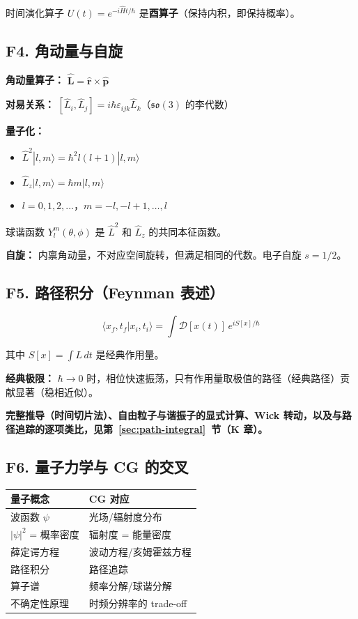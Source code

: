 时间演化算子 $U(t) = e^{-i\hat{H}t/\hbar}$ 是\textbf{酉算子}（保持内积，即保持概率）。

\subsection{F4. 角动量与自旋}

\textbf{角动量算子：} $\hat{\mathbf{L}} = \hat{\mathbf{r}} \times \hat{\mathbf{p}}$

\textbf{对易关系：} $[\hat{L}_i, \hat{L}_j] = i\hbar\varepsilon_{ijk}\hat{L}_k$（$\mathfrak{so}(3)$ 的李代数）

\textbf{量子化：}
\begin{itemize}
  \item $\hat{L}^2|l,m\rangle = \hbar^2 l(l+1)|l,m\rangle$
  \item $\hat{L}_z|l,m\rangle = \hbar m|l,m\rangle$
  \item $l = 0, 1, 2, \ldots$，$m = -l, -l+1, \ldots, l$
\end{itemize}

球谐函数 $Y_l^m(\theta, \phi)$ 是 $\hat{L}^2$ 和 $\hat{L}_z$ 的共同本征函数。

\textbf{自旋：} 内禀角动量，不对应空间旋转，但满足相同的代数。电子自旋 $s = 1/2$。

\subsection{F5. 路径积分（Feynman 表述）}
\label{subsec:pi-brief}

\[
\langle x_f, t_f | x_i, t_i \rangle = \int \mathcal{D}[x(t)]\, e^{iS[x]/\hbar}
\]

其中 $S[x] = \displaystyle\int L\,dt$ 是经典作用量。

\textbf{经典极限：} $\hbar \to 0$ 时，相位快速振荡，只有作用量取极值的路径（经典路径）贡献显著（稳相近似）。

\textbf{完整推导（时间切片法）、自由粒子与谐振子的显式计算、Wick 转动，以及与路径追踪的逐项类比，见第~\ref{sec:path-integral}~节（K 章）。}

\subsection{F6. 量子力学与 CG 的交叉}

\begin{center}
\begin{tabular}{ll}
\toprule
\textbf{量子概念} & \textbf{CG 对应} \\
\midrule
波函数 $\psi$ & 光场/辐射度分布 \\
$|\psi|^2$ = 概率密度 & 辐射度 = 能量密度 \\
薛定谔方程 & 波动方程/亥姆霍兹方程 \\
路径积分 & 路径追踪 \\
算子谱 & 频率分解/球谐分解 \\
不确定性原理 & 时频分辨率的 trade-off \\
\bottomrule
\end{tabular}
\end{center}